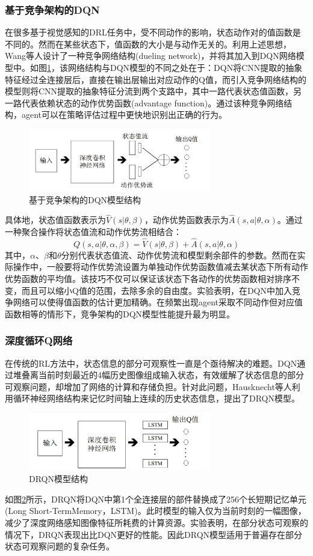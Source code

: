 \documentclass[bachelor]{thesis-uestc}
\begin{document}
	\subsubsection{基于竞争架构的DQN}
	在很多基于视觉感知的DRL任务中，受不同动作的影响，状态动作对的值函数是不同的。然而在某些状态下，值函数的大小是与动作无关的。利用上述思想，Wang等人设计了一种竞争网络结构(dueling network)，并将其加入到DQN网络模型中。如图\ref{fg3}，该网络结构与DQN模型的不同之处在于：DQN将CNN提取的抽象特征经过全连接层后，直接在输出层输出对应动作的Q值，而引入竞争网络结构的模型则将CNN提取的抽象特征分流到两个支路中，其中一路代表状态值函数，另一路代表依赖状态的动作优势函数(advantage function)。通过该种竞争网络结构，agent可以在策略评估过程中更快地识别出正确的行为。
	\begin{figure}
		\includegraphics[width=8cm]{./pic/fg3.jpg}
		\caption{基于竞争架构的DQN模型结构}
		\label{fg3}
	\end{figure}
	具体地，状态值函数表示为$\hat{V}(s|\theta,\beta)$，动作优势函数表示为$\hat{A}(s,a|\theta,\alpha)$。通过一种聚合操作将状态值流和动作优势流相结合：
	\begin{equation}
		\label{eq13}
		Q(s,a|\theta,\alpha,\beta)=\hat{V}(s|\theta,\beta)+\hat{A}(s,a|\theta,\alpha)
	\end{equation}
	其中，$\alpha$、$\beta$和$\theta$分别代表状态值流、动作优势流和模型剩余部件的参数。然而在实际操作中，一般要将动作优势流设置为单独动作优势函数值减去某状态下所有动作优势函数的平均值。该技巧不仅可以保证该状态下各动作的优势函数相对排序不变，而且可以缩小Q值的范围，去除多余的自由度。实验表明，在DQN中加入竞争网络可以使得值函数的估计更加精确。在频繁出现agent采取不同动作但对应值函数相等的情形下，竞争架构的DQN模型性能提升最为明显。
	
	\subsubsection{深度循环Q网络}
	在传统的RL方法中，状态信息的部分可观察性一直是个亟待解决的难题。DQN通过堆叠离当前时刻最近的4幅历史图像组成输入状态，有效缓解了状态信息的部分可观察问题，却增加了网络的计算和存储负担。针对此问题，Hausknecht等人利用循环神经网络结构来记忆时间轴上连续的历史状态信息，提出了DRQN模型。
	\begin{figure}
		\includegraphics[width=8cm]{./pic/fg4.jpg}
		\caption{DRQN模型结构}
		\label{fg4}
	\end{figure}
	如图\ref{fg4}所示，DRQN将DQN中第1个全连接层的部件替换成了256个长短期记忆单元(Long Short-TermMemory，LSTM)。此时模型的输入仅为当前时刻的一幅图像，减少了深度网络感知图像特征所耗费的计算资源。实验表明，在部分状态可观察的情况下，DRQN表现出比DQN更好的性能。因此DRQN模型适用于普遍存在部分状态可观察问题的复杂任务。
	
\end{document}

